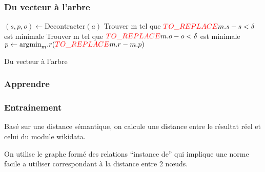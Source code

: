 \begin{frame}
\frametitle{Du vecteur à l'arbre}
\begin{algorithm}[H]
\DontPrintSemicolon  %
$(s,p,o) \gets \text{Decontracter}(a)$\;
Trouver m tel que $\textcolor{red}{TO\_REPLACE}{m.s-s}<\delta$ est minimale \;
Trouver m tel que  $\textcolor{red}{TO\_REPLACE}{m.o-o}<\delta$ est minimale \;
$p \gets \text{argmin}_m.r (\textcolor{red}{TO\_REPLACE}{m.r-m.p})$\;
\;
\caption{ Du vecteur à l'arbre }
\end{algorithm}

\end{frame}

\subsubsection{Apprendre}

\begin{frame}
\frametitle{Entrainement}
Basé sur une distance sémantique, on calcule une distance entre le résultat réel et celui du module wikidata.

On utilise le graphe formé des relations ``instance de'' qui implique une norme facile a utiliser correspondant à la distance entre 2 nœuds.
\end{frame} 
